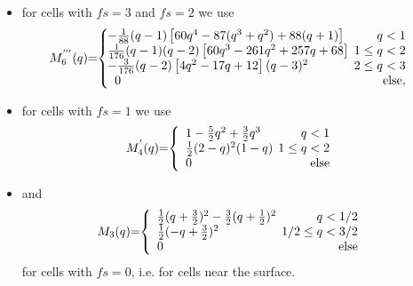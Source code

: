 \documentclass[useAMS,usenatbib]{iopart}
\begin{document}
\begin{itemize}
	\item for cells with $fs=3$ and $fs=2$ we use \cite{bergdorf06}    
    \[
   \hspace*{-0.2cm} M^{'''}_6 (q)  \hspace*{-0.1cm} =  \hspace*{-0.1cm} \left\{\begin{array}{lr}
\hspace*{-0.2cm}         -\frac{1}{88}(q - 1)\left[60 q^4 - 87(q^3 + q^2) + 88(q + 1)\right]&  \hspace*{-0.2cm} q <  1\\
\hspace*{-0.2cm}          \frac{1}{176}  (q-1) (q-2)\left[60q^3 - 261 q^2 +257 q  + 68\right] &  \hspace*{-0.2cm} 1\leq q <2\\
\hspace*{-0.2cm}          -\frac{3}{176}  (q-2) \left[4q^2 - 17 q + 12 \right] (q-3)^2&  \hspace*{-0.2cm} 2\leq q < 3\\
        0 &\hspace*{-0.2cm} {\rm else},
        \end{array}\right. 
  \]
  \item for cells with  $fs=1$ we use \cite{monaghan85b,cottet00}  
   \[
   \hspace*{-0.2cm} M^{'}_4 (q)  \hspace*{-0.1cm} =  \hspace*{-0.1cm} \left\{\begin{array}{lr}
        1 - \frac{5}{2}q^2 + \frac{3}{2}q^3 &  \hspace*{-0.2cm} q <  1\\
        \frac{1}{2}(2-q)^2 (1-q)  &  \hspace*{-0.2cm} 1\leq q <2\\
        0 &\hspace*{-0.2cm} {\rm else}
        \end{array}\right. 
  \]
  \item and \cite{hockney88}
   \[
   \hspace*{-0.2cm} M_3(q)  \hspace*{-0.1cm} =  \hspace*{-0.1cm} \left\{\begin{array}{lr}
        \frac{1}{2}(q+\frac{3}{2})^2 - \frac{3}{2}(q+\frac{1}{2})^2 &  \hspace*{-0.2cm} q <  1/2\\
        \frac{1}{2}(-q+\frac{3}{2})^2  &  \hspace*{-0.2cm} 1/2 \leq q <3/2\\
        0 &\hspace*{-0.2cm} {\rm else}
        \end{array}\right. 
  \]  for cells with $fs=0$, i.e. for cells near the surface.
  \end{itemize}
\end{document}
